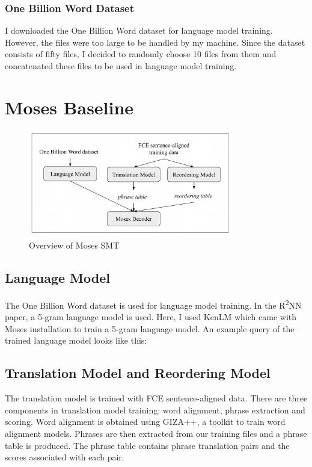 \documentclass[12pt,a4paper,twoside,openright]{report}
\begin{document}
\subsubsection{One Billion Word Dataset}

I downloaded the One Billion Word dataset for language model training. However, the files were too large to be handled by my machine. Since the dataset consists of fifty files, I decided to randomly choose 10 files from them and concatenated these files to be used in language model training. 


\section{Moses Baseline}

\begin{figure}[ht]
\centering
\includegraphics[width=0.8\textwidth]{images/moses_pipeline.png}
\caption{Overview of Moses SMT}
\label{fig:moses_pipeline}
\end{figure}

\subsection{Language Model}
The One Billion Word dataset is used for language model training. In the R\textsuperscript{2}NN paper, a 5-gram language model is used. Here, I used KenLM which came with Moses installation to train a 5-gram language model. An example query of the trained language model looks like this:

\subsection{Translation Model and Reordering Model}
The translation model is trained with FCE sentence-aligned data. There are three components in translation model training: word alignment, phrase extraction and scoring. Word alignment is obtained using GIZA++, a toolkit to train word alignment models. Phrases are then extracted from our training files and a phrase table is produced. The phrase table contains phrase translation pairs and the scores associated with each pair.
\end{document}
